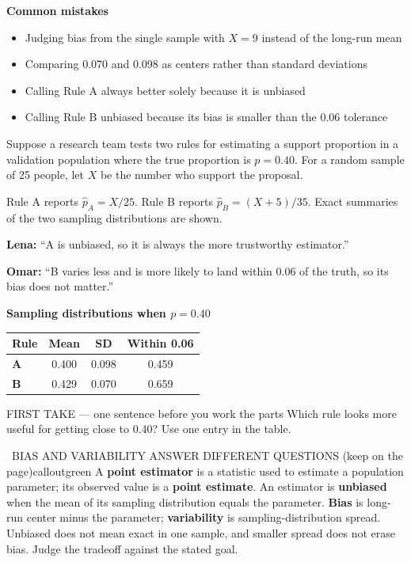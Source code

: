 \documentclass[11pt]{article}
\begin{document}
\textbf{Common mistakes}
\begin{itemize}[leftmargin=1.5em,itemsep=2pt,topsep=2pt]
  \item Judging bias from the single sample with $X=9$ instead of the long-run mean
  \item Comparing 0.070 and 0.098 as centers rather than standard deviations
  \item Calling Rule A always better solely because it is unbiased
  \item Calling Rule B unbiased because its bias is smaller than the 0.06 tolerance
\end{itemize}

\clearpage
{}

Suppose a research team tests two rules for estimating a support proportion in a validation population where the true proportion is $p=0.40$. For a random sample of 25 people, let $X$ be the number who support the proposal.\par\smallskip Rule A reports $\widehat p_A=X/25$. Rule B reports $\widehat p_B=(X+5)/35$. Exact summaries of the two sampling distributions are shown.\par\smallskip \textbf{Lena:} ``A is unbiased, so it is always the more trustworthy estimator.''\par \textbf{Omar:} ``B varies less and is more likely to land within 0.06 of the truth, so its bias does not matter.''\par
\begin{center}
\textbf{Sampling distributions when $p=0.40$}\par\smallskip
\begin{tabular}{|l|c|c|c|}
\hline
\textbf{Rule} & \textbf{Mean} & \textbf{SD} & \textbf{Within 0.06} \\ \hline
\textbf{A} & 0.400 & 0.098 & 0.459 \\ \hline
\textbf{B} & 0.429 & 0.070 & 0.659 \\ \hline
\end{tabular}
\end{center}
\begin{firsttakebox}{FIRST TAKE --- one sentence before you work the parts}
Which rule looks more useful for getting close to 0.40? Use one entry in the table.\par
{}
\end{firsttakebox}

\begin{callout}{\IconBook\ BIAS AND VARIABILITY ANSWER DIFFERENT QUESTIONS (keep on the page)}{calloutgreen}
A \textbf{point estimator} is a statistic used to estimate a population parameter; its observed value is a
\textbf{point estimate}. An estimator is \textbf{unbiased} when the mean of its sampling distribution equals the
parameter. \textbf{Bias} is long-run center minus the parameter; \textbf{variability} is sampling-distribution spread.
Unbiased does not mean exact in one sample, and smaller spread does not erase bias. Judge the tradeoff against the stated goal.
\end{callout}
\end{document}
